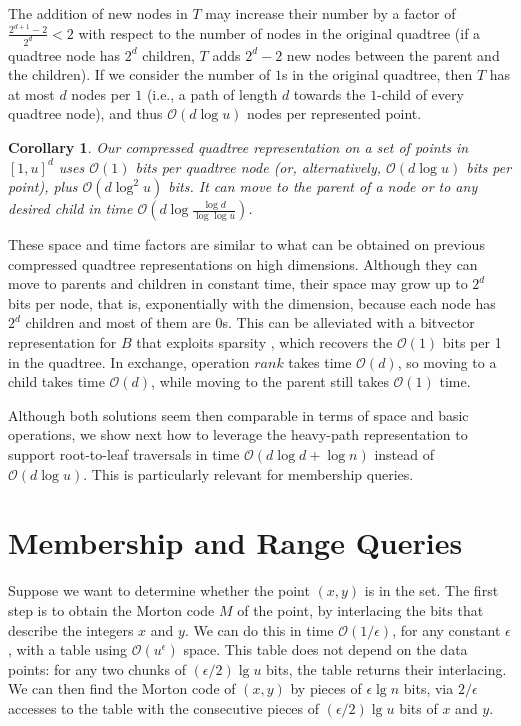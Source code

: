 \documentclass{elsarticle}
\newtheorem{corollary}[theorem]{Corollary}
\newcommand{\Oh}[1]
  {\ensuremath{\mathcal{O}\!\left( {#1} \right)}}
\begin{document}
The addition of new nodes in $T$ may increase their number by a factor of $\frac{2^{d+1}-2}{2^d} < 2$ with respect to the number of nodes in the original quadtree (if a quadtree node has $2^d$ children, $T$ adds $2^d-2$ new nodes between the parent and the children). If we consider the number of $1$s in the original quadtree, then $T$ has at most $d$ nodes per $1$ (i.e., a path of length $d$ towards the $1$-child of every quadtree node), and thus $\Oh{d\log u}$ nodes per represented point.

\begin{corollary}
Our compressed quadtree representation on a set of points in $[1,u]^d$ uses $\Oh{1}$ bits per quadtree node (or, alternatively, $\Oh{d\log u}$ bits per point), plus $\Oh{d\log^2 u}$ bits. It can move to the parent of a node or to any desired child in time $\Oh{d\log\frac{\log d}{\log\log u}}$.
\end{corollary}

These space and time factors are similar to what can be obtained on previous compressed quadtree representations \cite{BLN14,Nav16} on high dimensions. Although they can move to parents and children in constant time, their space may grow up to $2^d$ bits per node, that is, exponentially with the dimension, because each node has $2^d$ children and most of them are $0$s. This can be alleviated with a bitvector representation for $B$ that exploits sparsity \cite{OS07}, which recovers the $\Oh{1}$ bits per 1 in the quadtree. In exchange, operation $rank$ takes time $\Oh{d}$, so moving to a child takes time $\Oh{d}$, while moving to the
parent still takes $\Oh{1}$ time.

Although both solutions seem then comparable in terms of space and basic operations, we show next how to leverage the heavy-path representation to support root-to-leaf traversals in time $\Oh{d\log d+\log n}$ instead of $\Oh{d\log u}$. This is particularly relevant for membership queries. 


\section{Membership and Range Queries}
\label{sec:membership}

Suppose we want to determine whether the point \((x, y)\) is in the set. The first step is to obtain the Morton code $M$ of the point, by interlacing the bits that describe the integers $x$ and $y$. We can do this in time $\Oh{1/\epsilon}$, for any constant $\epsilon$, with a table using $\Oh{u^\epsilon}$ space. This table does not depend on the data points: for any two chunks of $(\epsilon/2) \lg u$ bits, the table returns their interlacing. We can then find the Morton code of $(x,y)$ by pieces of $\epsilon \lg n$ bits, via $2/\epsilon$ accesses to the table with the consecutive pieces of $(\epsilon/2)\lg u$ bits of $x$ and $y$.
\end{document}
